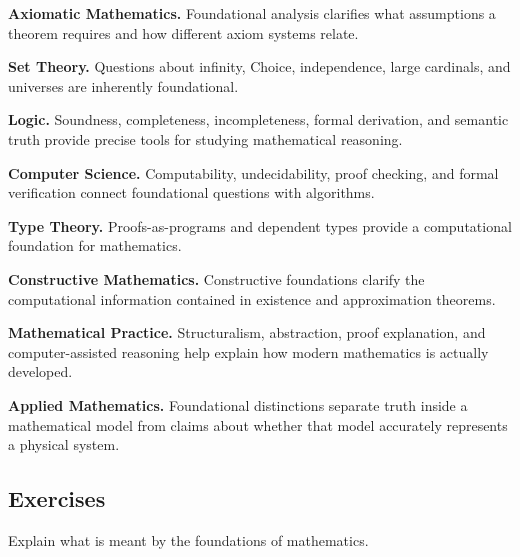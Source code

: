 \begin{applicationbox}

\textbf{Axiomatic Mathematics.}
Foundational analysis clarifies what assumptions a theorem requires and how
different axiom systems relate.

\medskip

\textbf{Set Theory.}
Questions about infinity, Choice, independence, large cardinals, and
universes are inherently foundational.

\medskip

\textbf{Logic.}
Soundness, completeness, incompleteness, formal derivation, and semantic
truth provide precise tools for studying mathematical reasoning.

\medskip

\textbf{Computer Science.}
Computability, undecidability, proof checking, and formal verification
connect foundational questions with algorithms.

\medskip

\textbf{Type Theory.}
Proofs-as-programs and dependent types provide a computational foundation
for mathematics.

\medskip

\textbf{Constructive Mathematics.}
Constructive foundations clarify the computational information contained in
existence and approximation theorems.

\medskip

\textbf{Mathematical Practice.}
Structuralism, abstraction, proof explanation, and computer-assisted
reasoning help explain how modern mathematics is actually developed.

\medskip

\textbf{Applied Mathematics.}
Foundational distinctions separate truth inside a mathematical model from
claims about whether that model accurately represents a physical system.

\end{applicationbox}

\subsection{Exercises}
\label{subsec:philosophy-foundations-exercises}

\begin{exercise}[1]
Explain what is meant by the foundations of mathematics.
\end{exercise}

